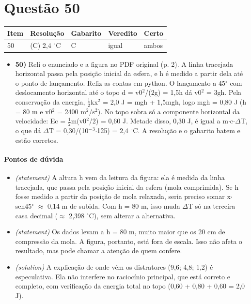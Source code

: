 \documentclass{article}%
\begin{document}
\section*{Questão 50}%
\begin{longtable}{@{}p{} p{} p{} p{} p{}@{}}\toprule Item & Resolução & Gabarito & Veredito & Certo \\ \midrule
50 & (C) 2,4 $^\circ$C & C & igual & ambos \\
\bottomrule\end{longtable}%
\begin{itemize}%
\item%
\textbf{50)} Reli o enunciado e a figura no PDF original (p. 2). A linha tracejada horizontal passa pela posição inicial da esfera, e h é medido a partir dela até o ponto de lançamento. Refiz as contas em python. O lançamento a 45$^\circ$ com deslocamento horizontal até o topo d = v0$^2$/(2g) = 1,5h dá v0$^2$ = 3gh. Pela conservação da energia, $\frac12$kx$^2$ = 2,0 J = mgh + 1,5mgh, logo mgh = 0,80 J (h = 80 m e v0$^2$ = 2400 m$^2$/s$^2$). No topo sobra só a componente horizontal da velocidade: Ec = $\frac12$m(v0$^2$/2) = 0,60 J. Metade disso, 0,30 J, é igual a m$\cdot$c$\cdot$$\Delta$T, o que dá $\Delta$T = 0,30/(10$^{-}$$^3$$\cdot$125) = 2,4 $^\circ$C. A resolução e o gabarito batem e estão corretos.%
\end{itemize}%
\paragraph{Pontos de dúvida}%
\begin{itemize}%
\item%
\textit{(statement)} A altura h vem da leitura da figura: ela é medida da linha tracejada, que passa pela posição inicial da esfera (mola comprimida). Se h fosse medido a partir da posição de mola relaxada, seria preciso somar x$\cdot$sen45$^\circ$ $\approx$ 0,14 m de subida. Com h = 80 m, isso muda $\Delta$T só na terceira casa decimal ($\approx$ 2,398 $^\circ$C), sem alterar a alternativa.%
\item%
\textit{(statement)} Os dados levam a h = 80 m, muito maior que os 20 cm de compressão da mola. A figura, portanto, está fora de escala. Isso não afeta o resultado, mas pode chamar a atenção de quem confere.%
\item%
\textit{(solution)} A explicação de onde vêm os distratores (9,6; 4,8; 1,2) é especulativa. Ela não interfere no raciocínio principal, que está correto e completo, com verificação da energia total no topo (0,60 + 0,80 + 0,60 = 2,0 J).%
\end{itemize}%
\end{document}
